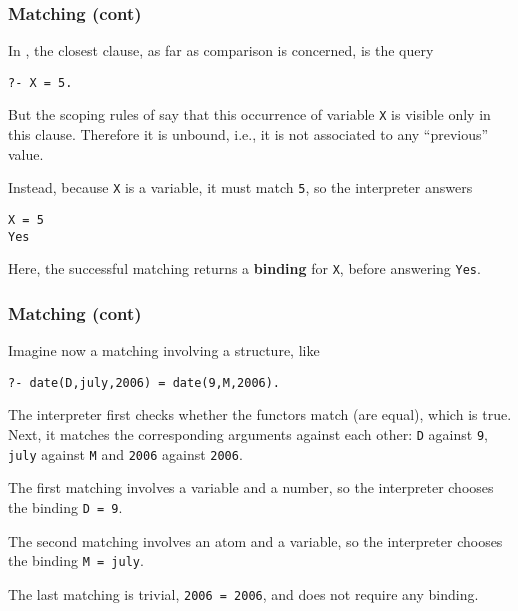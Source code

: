 %
\begin{frame}[containsverbatim]
\frametitle{Matching (cont)}

In \Prolog, the closest clause, as far as comparison is concerned, is
the query
{\small
\begin{verbatim}
?- X = 5.
\end{verbatim}
}
But the scoping rules of \Prolog say that this occurrence of variable
\texttt{X} is visible only in this clause. Therefore it is unbound,
i.e., it is not associated to any ``previous'' value.

\bigskip

Instead, because \texttt{X} is a variable, it must match \texttt{5},
so the interpreter answers
{\small
\begin{verbatim}
X = 5
Yes
\end{verbatim}
} 
Here, the successful matching returns a \textbf{binding} for
\texttt{X}, before answering \texttt{Yes}.

\end{frame}

%
\begin{frame}[containsverbatim]
\frametitle{Matching (cont)}

Imagine now a matching involving a structure, like
{\small
\begin{verbatim}
?- date(D,july,2006) = date(9,M,2006).
\end{verbatim}
}
The interpreter first checks whether the functors match (are equal),
which is true. Next, it matches the corresponding arguments against
each other: \texttt{D} against \texttt{9}, \texttt{july} against
\texttt{M} and \texttt{2006} against \texttt{2006}. 

\bigskip

The first matching involves a variable and a number, so the
interpreter chooses the binding \texttt{D = 9}.

\bigskip

The second matching involves an atom and a variable, so the
interpreter chooses the binding \texttt{M = july}.

\bigskip

The last matching is trivial, \texttt{2006 = 2006}, and does not
require any binding.

\end{frame}

